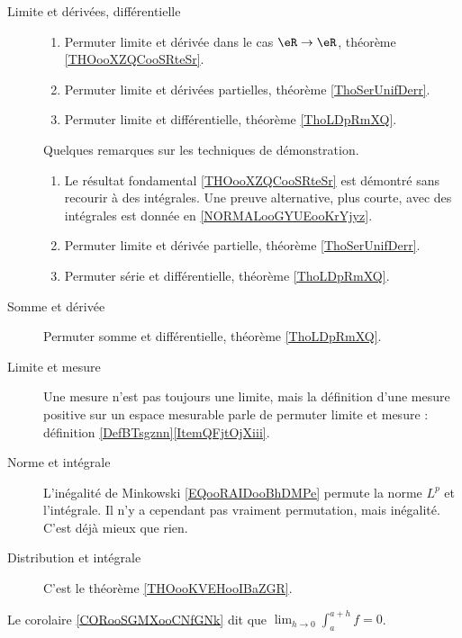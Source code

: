 \begin{description}
	\item[Limite et dérivées, différentielle]
		\begin{enumerate}
			\item
			      Permuter limite et dérivée dans le cas \( \eR\to \eR\), théorème \ref{THOooXZQCooSRteSr}.
			\item
			      Permuter limite et dérivées partielles, théorème \ref{ThoSerUnifDerr}.
			\item
			      Permuter limite et différentielle, théorème \ref{ThoLDpRmXQ}.
		\end{enumerate}
		Quelques remarques sur les techniques de démonstration.
		\begin{enumerate}
			\item
			      Le résultat fondamental \ref{THOooXZQCooSRteSr} est démontré sans recourir à des intégrales. Une preuve alternative, plus courte, avec des intégrales est donnée en \ref{NORMALooGYUEooKrYjyz}.
			\item
			      Permuter limite et dérivée partielle, théorème \ref{ThoSerUnifDerr}.
			\item
			      Permuter série et différentielle, théorème \ref{ThoLDpRmXQ}.
		\end{enumerate}
	\item[Somme et dérivée]
		Permuter somme et différentielle, théorème \ref{ThoLDpRmXQ}.
	\item[Limite et mesure]
		Une mesure n'est pas toujours une limite, mais la définition d'une mesure positive sur un espace mesurable parle de permuter limite et mesure : définition \ref{DefBTsgznn}\ref{ItemQFjtOjXiii}.
	\item[Norme et intégrale]
		L'inégalité de Minkowski \eqref{EQooRAIDooBhDMPe} permute la norme \( L^p\) et l'intégrale. Il n'y a cependant pas vraiment permutation, mais inégalité. C'est déjà mieux que rien.
	\item[Distribution et intégrale] C'est le théorème \ref{THOooKVEHooIBaZGR}.
\end{description}

Le corolaire \ref{CORooSGMXooCNfGNk} dit que \( \lim_{h\to 0}\int_a^{a+h}f=0\).
